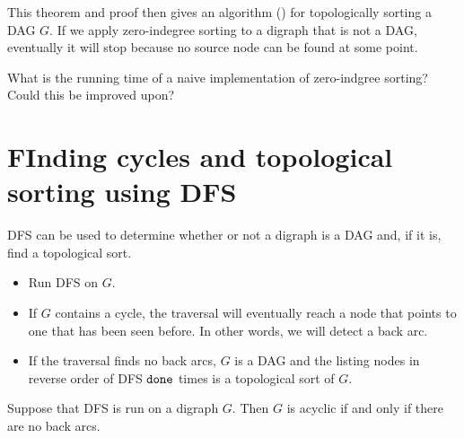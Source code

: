 This theorem and proof then gives an algorithm ()
for topologically sorting a DAG $G$. If we apply zero-indegree sorting to a digraph that is not
a DAG, eventually it will stop because no source node can be found at
some point.

\begin{Boxample}[3]
What is the running time of a naive implementation of zero-indgree sorting? Could this be improved upon?
\end{Boxample}
%


\section{FInding cycles and topological sorting using DFS}

DFS can be used to determine whether or not a digraph is a DAG and, if it is, find a topological sort.
\begin{itemize}
\item Run DFS on $G$.
\item If $G$ contains a cycle,  the traversal will eventually reach a node that points to one that has been seen before. 
In other words, we will detect a back arc. 
\item If the traversal finds no back arcs, $G$ is a DAG 
and the listing nodes in reverse order of DFS $\done$ times is a topological sort of $G$.
\end{itemize}

\begin{Theorem}
\label{thm:findDAG}
Suppose that DFS is run on a digraph $G$. Then $G$ is acyclic if and only if there are no back arcs.
\end{Theorem}
%
%

